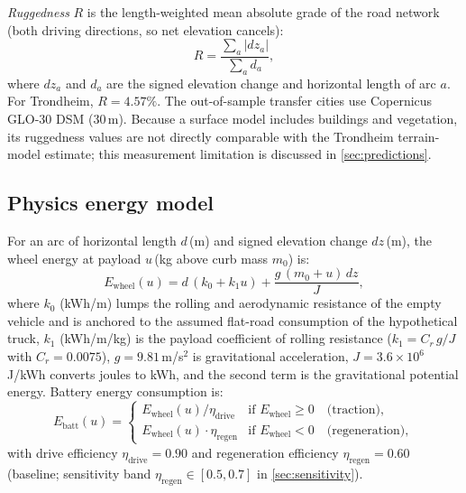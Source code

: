 \documentclass[review,3p,authoryear]{elsarticle}
\begin{document}
\emph{Ruggedness} $R$ is the length-weighted mean absolute grade of the
road network (both driving directions, so net elevation cancels):
\begin{equation}
  R = \frac{\sum_a |dz_a|}{\sum_a d_a},
  \label{eq:ruggedness}
\end{equation}
where $dz_a$ and $d_a$ are the signed elevation change and horizontal
length of arc $a$.  For Trondheim, $R = 4.57\%$.  The out-of-sample
transfer cities use Copernicus GLO-30 DSM (30\,m).  Because a surface
model includes buildings and vegetation, its ruggedness values are not
directly comparable with the Trondheim terrain-model estimate; this
measurement limitation is discussed in \cref{sec:predictions}.

\subsection{Physics energy model}
\label{sec:energy}

For an arc of horizontal length $d$\,(m) and signed elevation change
$dz$\,(m), the wheel energy at payload $u$\,(kg above curb mass $m_0$) is:
\begin{equation}
  E_{\text{wheel}}(u) = d\,(k_0 + k_1 u) + \frac{g\,(m_0 + u)\,dz}{J},
  \label{eq:Ewheel}
\end{equation}
where $k_0$ (kWh/m) lumps the rolling and aerodynamic resistance of the
empty vehicle and is anchored to the assumed flat-road consumption of the
hypothetical truck, $k_1$ (kWh/m/kg) is the payload coefficient of rolling
resistance ($k_1 = C_r\,g / J$ with $C_r = 0.0075$),
$g = 9.81$\,m/s$^2$ is gravitational acceleration,
$J = 3.6 \times 10^6$\,J/kWh converts joules to kWh, and the second term
is the gravitational potential energy.  Battery energy consumption is:
\begin{equation}
  E_{\text{batt}}(u) =
  \begin{cases}
    E_{\text{wheel}}(u) / \eta_{\text{drive}} & \text{if } E_{\text{wheel}} \ge 0 \quad \text{(traction)},\\
    E_{\text{wheel}}(u) \cdot \eta_{\text{regen}} & \text{if } E_{\text{wheel}} < 0 \quad \text{(regeneration)},
  \end{cases}
  \label{eq:Ebatt}
\end{equation}
with drive efficiency $\eta_{\text{drive}} = 0.90$ and regeneration
efficiency $\eta_{\text{regen}} = 0.60$ (baseline; sensitivity band
$\eta_{\text{regen}} \in [0.5, 0.7]$ in \cref{sec:sensitivity}).
\end{document}
